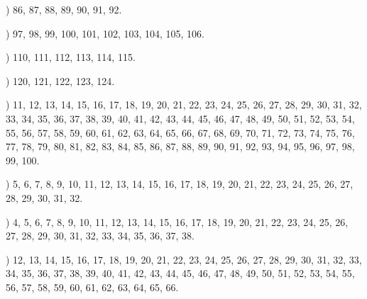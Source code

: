 \documentclass[a4paper,11pt]{article}
\begin{document}
\vspace{\spaceFour}



\noindent
{}) 86, 87, 88, 89, 90, 91, 92.

\vspace{\spaceFour}



\noindent
{}) 97, 98, 99, 100, 101, 102, 103, 104, 105, 106.

\vspace{\spaceFour}



\noindent
{}) 110, 111, 112, 113, 114, 115.

\vspace{\spaceFour}



\noindent
{}) 120, 121, 122, 123, 124.

\vspace{\spaceFour}



\noindent
{}) 11, 12, 13, 14, 15, 16, 17, 18, 19, 20, 21, 22, 23,
24, 25, 26, 27, 28, 29, 30, 31, 32, 33, 34, 35, 36, 37, 38, 39, 40,
41, 42, 43, 44, 45, 46, 47, 48, 49, 50, 51, 52, 53, 54, 55, 56, 57,
58, 59, 60, 61, 62, 63, 64, 65, 66, 67, 68, 69, 70, 71, 72, 73, 74,
75, 76, 77, 78, 79, 80, 81, 82, 83, 84, 85, 86, 87, 88, 89, 90, 91,
92, 93, 94, 95, 96, 97, 98, 99, 100.

\vspace{\spaceFour}



\noindent
{}) 5, 6, 7, 8, 9, 10, 11, 12, 13, 14, 15, 16, 17, 18,
19, 20, 21, 22, 23, 24, 25, 26, 27, 28, 29, 30, 31, 32.

\vspace{\spaceFour}



\noindent
{}) 4, 5, 6, 7, 8, 9, 10, 11, 12, 13, 14, 15, 16, 17, 18,
19, 20, 21, 22, 23, 24, 25, 26, 27, 28, 29, 30, 31, 32, 33, 34, 35,
36, 37, 38.

\vspace{\spaceFour}



\noindent
{}) 12, 13, 14, 15, 16, 17, 18, 19, 20, 21, 22, 23, 24,
25, 26, 27, 28, 29, 30, 31, 32, 33, 34, 35, 36, 37, 38, 39, 40, 41,
42, 43, 44, 45, 46, 47, 48, 49, 50, 51, 52, 53, 54, 55, 56, 57, 58,
59, 60, 61, 62, 63, 64, 65, 66.
\end{document}
